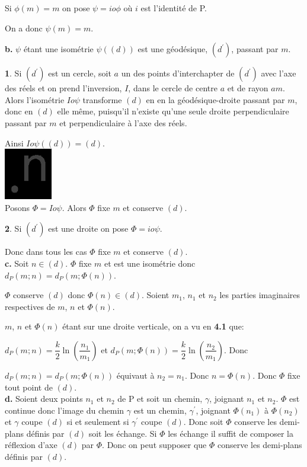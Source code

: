 \documentclass[a4paper, 12pt, twoside]{book}
\begin{document}
 Si $\phi(m)= m$ on pose $\psi= io\phi$ où $i$ est l'identité de P.\
 
 On a donc $\psi(m)=m$.\
 
 \textbf{b.}  $\psi$ étant une isométrie $\psi((d))$ est une géodésique, $(d^{'})$,  passant par $m$.\
 
 \textbf{1}. Si  $(d^{'})$ est un cercle, soit $a$ un des points d'interchapter de  $(d^{'})$ avec l'axe des réels et on prend l'inversion, $I$, dans le cercle de centre $a$ et de rayon $am$. Alors l'isométrie $Io\psi$  transforme  $(d)$ en en la géodésique-droite passant par $m$, donc en $(d)$ elle même, puisqu'il n'existe qu'une seule droite perpendiculaire passant par $m$ et perpendiculaire à l'axe des réels.\
 
 Ainsi $Io\psi((d))=(d)$. \\
 
 \includegraphics[scale=0.5]{figures/hyper5.eps} \\
 
 Posons $\Phi=Io\psi$. Alors $\Phi$ fixe $m$ et conserve $(d)$.\
 
 \textbf{2}.  Si  $(d^{'})$ est une droite on pose $\Phi=io\psi$.\
 
 Donc dans tous les cas $\Phi$ fixe $m$ et conserve $(d)$.\\
 
\textbf{c.} Soit $n\in (d)$. $\Phi$ fixe $m$ et est une isométrie donc $d_{P}(m;n)=d_{P}(m;\Phi(n))$.\

$\Phi$ conserve $(d)$ donc $\Phi(n)\in (d)$. Soient $m_{1}$, $n_{1}$ et $n_{2}$ les parties imaginaires respectives de $m$, $n$ et $\Phi(n)$.\ 

$m$, $n$ et $\Phi(n)$ étant sur une droite verticale, on a vu en \textbf{4.1} que:\

 $d_{P}(m;n)=\dfrac{k}{2}\ln(\dfrac{n_{1}}{m_{1}})$ et $d_{P}(m;\Phi(n))=\dfrac{k}{2}\ln(\dfrac{n_{2}}{m_{1}})$. Donc\

$d_{P}(m;n)=d_{P}(m;\Phi(n))$ équivaut à $n_{2}=n_{1}$. Donc $n=\Phi(n)$. Donc $\Phi$ fixe tout point de $(d)$.\\

\textbf{d.}   Soient deux points $n_{1}$ et $n_{2}$  de P et soit un chemin, $\gamma$, joignant $n_{1}$ et $n_{2}$. $\Phi$ est continue donc l'image du chemin $\gamma$ est un chemin, $\gamma^{'}$, joignant $\Phi(n_{1})$ à $\Phi(n_{2})$ et  $\gamma$ coupe $(d)$ si et seulement si $\gamma^{'}$ coupe $(d)$. Donc soit $\Phi$ conserve les demi-plans définis par $(d)$ soit les échange. Si $\Phi$ les échange il suffit de composer la réflexion d'axe $(d)$ par $\Phi$. Donc on peut supposer que $\Phi$ conserve les demi-plans définis par $(d)$.\\
\end{document}
